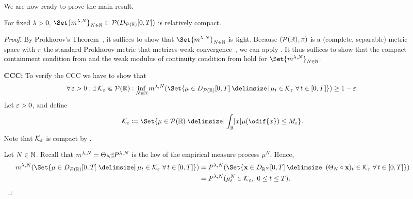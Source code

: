 We are now ready to prove the main result.

\begin{theorem}
  For fixed \(\lambda > 0\), \(\Set{ \lawmu^{\lambda, N} }_{N\in\bN} \subset \cP(D_{\cP(\potspace)}[0,T])\) is relatively compact.
\end{theorem}

\begin{proof}
  By Prokhorov's Theorem~\cite[Theorem 5.1]{billingsleyConvergenceProbabilityMeasures1999}, it suffices to show that \(\Set{ \lawmu^{\lambda, N} }_{N\in\bN}\) is tight.
  Because \((\mathcal{P}(\mathbb{R}), \pi)\) is a (complete, separable) metric space with \( \pi \) the standard Prokhorov metric that metrizes weak convergence~\cite[Theorem 6.8]{billingsleyConvergenceProbabilityMeasures1999}, we can apply .
  It thus suffices to show that the compact containment condition from  and the weak modulus of continuity condition from  hold for \( \Set{ \lawmu^{\lambda, N} }_{N\in\bN} \).

  \textbf{CCC:}
  To verify the CCC we have to show that
  \begin{equation}
    \forall \eps > 0 : \exists \cK_\eps \Subset \cP(\potspace) :
    \inf_{N\in\bN} \lawmu^{\lambda, N} ( \Set{ \mu \in D_{\cP(\potspace)}[0,T] \given \mu_t \in \cK_\eps\ \forall t \in [0,T] } ) \geq 1 - \eps.
  \end{equation}
  Let \(\varepsilon > 0\), and define
  \begin{equation}
    \cK_\eps \coloneqq \Set{ \mu \in \cP(\potspace) \given \int_\potspace \abs{x} \mu(\odif{x}) \leq M_\eps }.
  \end{equation}
  Note that \( \mathcal{K}_\varepsilon \) is compact by .

  Let \( N \in \mathbb{N} \).
  Recall that \(m^{\lambda, N} = \Theta_N \sharp P^{\lambda, N}\) is the law of the empirical measure process \(\mu^N\).
  Hence,
  \begin{equation}
    \begin{split}
      \lawmu^{\lambda, N} ( \Set{ \mu \in D_{\cP(\potspace)}[0,T] \given \mu_t \in \cK_\eps\ \forall t \in [0,T] } )
       & = P^{\lambda, N}( \Set{ \bm{x} \in D_{\potspace^N}[0,T] \given (\Theta_N \circ \bm{x})_t \in \cK_\eps\ \forall t \in [0,T] } ) \\
       & = P^{\lambda, N} (\mu_t^N \in \cK_\eps,\ 0 \leq t \leq T).
    \end{split}
  \end{equation}


\end{proof}
